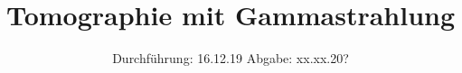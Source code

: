 

\subject{V14}
\title{Tomographie mit Gamma­strahlung}
\date{
  Durchführung: 16.12.19
  \hspace{3em}
  Abgabe: xx.xx.20?
}



\maketitle
\thispagestyle{empty}
\tableofcontents
\newpage




%



\newpage
\printbibliography


